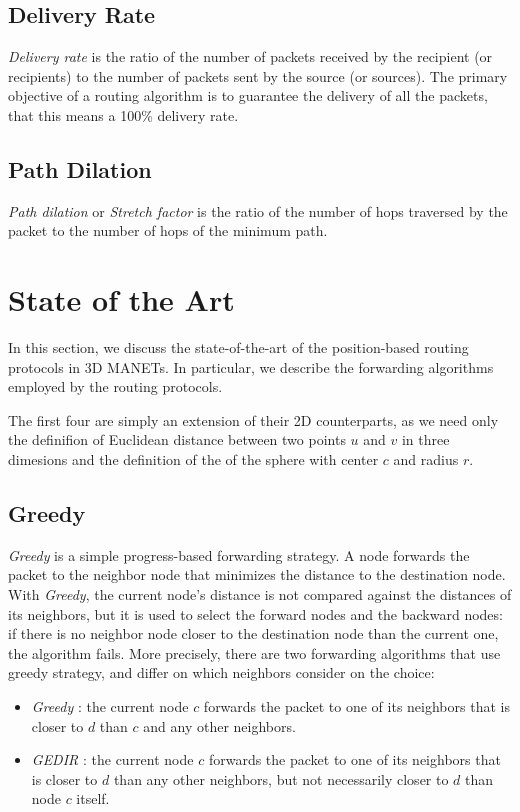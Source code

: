\documentclass[journal,comsoc]{IEEEtran}
\begin{document}
\subsection{Delivery Rate}
\textit{Delivery rate} is the ratio of the number of packets received by the recipient (or recipients) to the number of packets sent by the source (or sources). The primary objective of a routing algorithm is to guarantee the delivery of all the packets, that this means a 100\% delivery rate.
\subsection{Path Dilation}
\textit{Path dilation} or \textit{Stretch factor} is the ratio of the number of hops traversed by the packet to the number of hops of the minimum path.

\section{State of the Art}
In this section, we discuss the state-of-the-art of the position-based routing protocols in 3D MANETs. In particular, we describe the forwarding algorithms employed by the routing protocols. 

The first four are simply an extension of their 2D counterparts, as we need only the definifion of Euclidean distance between two points \(u\) and \(v\) in three dimesions and the definition of the of the sphere with center \(c\) and radius \(r\).

\subsection{Greedy}
\emph{Greedy} is a simple progress-based forwarding strategy. A node forwards the packet to the neighbor node that minimizes the distance to the destination node. With \emph{Greedy}, the current node's distance is not compared against the distances of its neighbors, but it is used to select the forward nodes and the backward nodes: if there is no neighbor node closer to the destination node than the current one, the algorithm fails. More precisely, there are two forwarding algorithms that use greedy strategy, and differ on which neighbors consider on the choice:
\begin{itemize}
\item \emph{Greedy} \cite{finn:greedy}: the current node \(c\) forwards the packet to one of its neighbors that is closer to \(d\) than \(c\) and any other neighbors.
\item \emph{GEDIR} \cite{lin:loop}: the current node \(c\) forwards the packet to one of its neighbors that is closer to \(d\) than any other neighbors, but not necessarily closer to \(d\) than node \(c\) itself.
\end{itemize}
\end{document}
